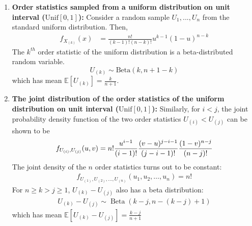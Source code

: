 \documentclass[11pt]{elegantbook}
\begin{document}
\begin{example}\quad
    \begin{enumerate}
        \item \textbf{Order statistics sampled from a uniform distribution on unit interval ($\text{Unif}[0,1]$):} Consider a random sample $U_1,...,U_n$ from the standard uniform distribution. Then,
        \begin{equation}
            \begin{aligned}
                f_{X_{(k)}}(x)&={\frac {n!}{(k-1)!(n-k)!}}u^{k-1}(1-u)^{n-k}
            \end{aligned}
            \nonumber
        \end{equation}
        The $k^{th}$ order statistic of the uniform distribution is a beta-distributed random variable. $$U_{(k)}\sim \text{Beta}(k,n+1-k)$$
        which has mean $\mathbb{E}[U_{(k)}]=\frac{k}{n+1}$.
        \item \textbf{The joint distribution of the order statistics of the uniform distribution on unit interval ($\text{Unif}[0,1]$):}
        Similarly, for $i < j$, the joint probability density function of the two order statistics $U_{(i)} < U_{(j)}$ can be shown to be
        \begin{equation}
            \begin{aligned}
                {\displaystyle f_{U_{(i)},U_{(j)}}(u,v)=n!{u^{i-1} \over (i-1)!}{(v-u)^{j-i-1} \over (j-i-1)!}{(1-v)^{n-j} \over (n-j)!}}
            \end{aligned}
            \nonumber
        \end{equation}
        The joint density of the $n$ order statistics turns out to be constant:
        \begin{equation}
            \begin{aligned}
                {\displaystyle f_{U_{(1)},U_{(2)},\ldots ,U_{(n)}}(u_{1},u_{2},\ldots ,u_{n})=n!}
            \end{aligned}
            \nonumber
        \end{equation}
        For $n\geq k>j\geq 1$, $U_{(k)}-U_{(j)}$ also has a beta distribution:
        \begin{equation}
            \begin{aligned}
                {\displaystyle U_{(k)}-U_{(j)}\sim \operatorname {Beta} (k-j,n-(k-j)+1)}
            \end{aligned}
            \nonumber
        \end{equation}
        which has mean $\mathbb{E}[U_{(k)}-U_{(j)}]=\frac{k-j}{n+1}$
    \end{enumerate}
\end{example}
\end{document}
